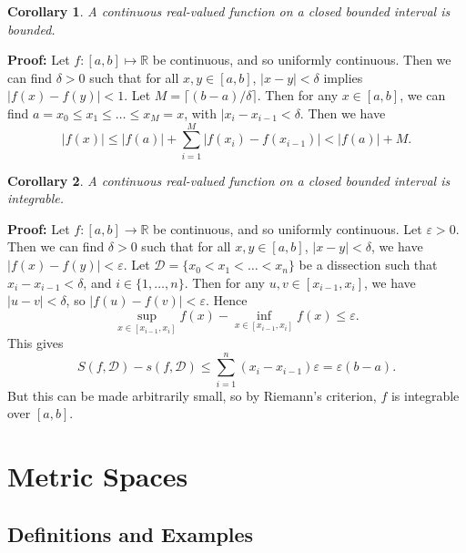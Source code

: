 \documentclass[12pt]{article}
\newtheorem{corollary}{Corollary}[section]
\theoremstyle{definition}
\theoremstyle{remark}
\begin{document}
\begin{corollary}
	A continuous real-valued function on a closed bounded interval is bounded.
\end{corollary}

\begin{adjustbox}{minipage = \columnwidth - 25.5pt, margin=1em, frame=1pt, margin=0em}
	\textbf{Proof:} Let $f : [a, b] \mapsto \mathbb{R}$ be continuous, and so uniformly continuous. Then we can find $\delta > 0$ such that for all $x, y \in [a, b]$, $|x - y| < \delta$ implies $|f(x) - f(y)| < 1$. Let $M = \lceil (b - a)/\delta \rceil$. Then for any $x \in [a, b]$, we can find $a = x_0 \leq x_1 \leq \ldots \leq x_M = x$, with $|x_{i} - x_{i-1}< \delta$. Then we have
	\[
		|f(x)| \leq |f(a)| + \sum_{i = 1}^{M} |f(x_i) - f(x_{i-1})| < |f(a)| + M
	.\]
\end{adjustbox}

\begin{corollary}
	A continuous real-valued function on a closed bounded interval is integrable.
\end{corollary}

\begin{adjustbox}{minipage = \columnwidth - 25.5pt, margin=1em, frame=1pt, margin=0em}
	\textbf{Proof:} Let $f : [a, b] \to \mathbb{R}$ be continuous, and so uniformly continuous. Let $\varepsilon > 0$. Then we can find $\delta > 0$ such that for all $x, y \in [a, b]$, $|x - y| < \delta$, we have $|f(x) - f(y)| < \varepsilon$. Let $\mathcal{D} = \{x_0 < x_1 < \ldots < x_n\}$ be a dissection such that $x_{i} - x_{i-1} < \delta$, and $i \in \{1, \ldots, n\}$. Then for any $u, v \in [x_{i-1}, x_i]$, we have $|u - v| < \delta$, so $|f(u) - f(v)| < \varepsilon$. Hence
	\[
		\sup_{x \in [x_{i-1}, x_i]} f(x) - \inf_{x \in [x_{i-1}, x_i]} f(x) \leq \varepsilon
	.\]
	This gives
	\[
		S(f, \mathcal{D}) - s(f, \mathcal{D}) \leq \sum_{i = 1}^{n}(x_i - x_{i-1})\varepsilon = \varepsilon(b - a)
	.\]
	But this can be made arbitrarily small, so by Riemann's criterion, $f$ is integrable over $[a, b]$.
\end{adjustbox}

\newpage

\section{Metric Spaces}%
\label{sec:metric_spaces}

\subsection{Definitions and Examples}%
\label{sub:definitions_and_examples}
\end{document}
